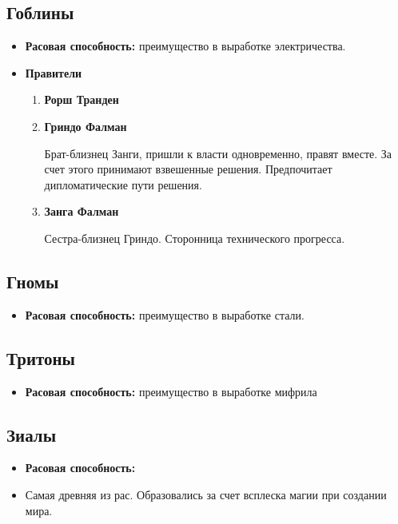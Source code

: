\documentclass[a4paper,12pt,landscape]{article}
\begin{document}
    \subsection{Гоблины}
    \begin{itemize}
      \item \textbf{Расовая способность:} преимущество в выработке электричества.
      \item \textbf{Правители}
        \begin{enumerate} 
          \item \textbf{Рорш Транден}
          \item \textbf{Гриндо Фалман}
          
          Брат-близнец Занги, пришли к власти одновременно, правят вместе. За счет этого принимают взвешенные решения. Предпочитает дипломатические пути решения.
          \item \textbf{Занга Фалман}
          
          Сестра-близнец Гриндо. Сторонница технического прогресса.
        \end{enumerate}
    \end{itemize}
    
    \subsection{Гномы}      
    \begin{itemize}
      \item \textbf{Расовая способность:} преимущество в выработке стали.      
    \end{itemize}  
    
    \subsection{Тритоны}
    \begin{itemize}
      \item \textbf{Расовая способность:} преимущество в выработке мифрила
    \end{itemize}
    
    \subsection{Зиалы}
    \begin {itemize}
      \item \textbf{Расовая способность:} 
      \item Самая древняя из рас. Образовались за счет всплеска магии при создании мира.
    \end{itemize}
\end{document}

